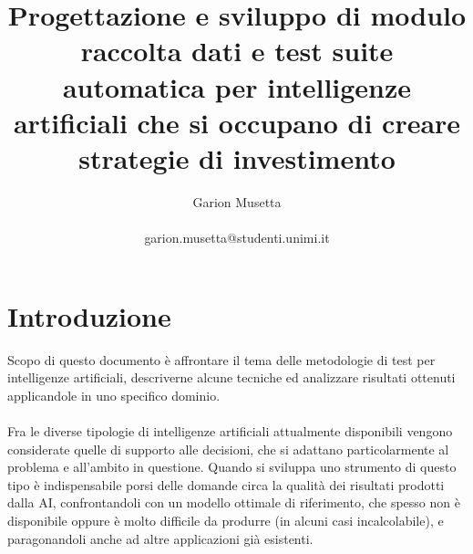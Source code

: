 \documentclass{article}
\title{\textbf{Progettazione e sviluppo di modulo raccolta dati e test suite automatica per intelligenze artificiali che si occupano di creare strategie di investimento}}
\author{Garion Musetta\\~\\garion.musetta@studenti.unimi.it}
\numberwithin{equation}{section}
\begin{document}
	\maketitle   
	\newpage
	\tableofcontents

	\newpage 
	 
	 
   	\section{Introduzione}
		Scopo di questo documento è affrontare il tema delle metodologie di test per intelligenze artificiali, descriverne alcune tecniche ed analizzare risultati ottenuti applicandole in uno specifico dominio.
		\\~\\
		Fra le diverse tipologie di intelligenze artificiali attualmente disponibili vengono considerate quelle di supporto alle decisioni, che si adattano particolarmente al problema e all'ambito in questione. Quando si sviluppa uno strumento di questo tipo è indispensabile porsi delle domande circa la qualità dei risultati prodotti dalla AI, confrontandoli con un modello ottimale di riferimento, che spesso non è disponibile oppure è molto difficile da produrre (in alcuni casi incalcolabile), e paragonandoli anche ad altre applicazioni già esistenti.
\end{document}
